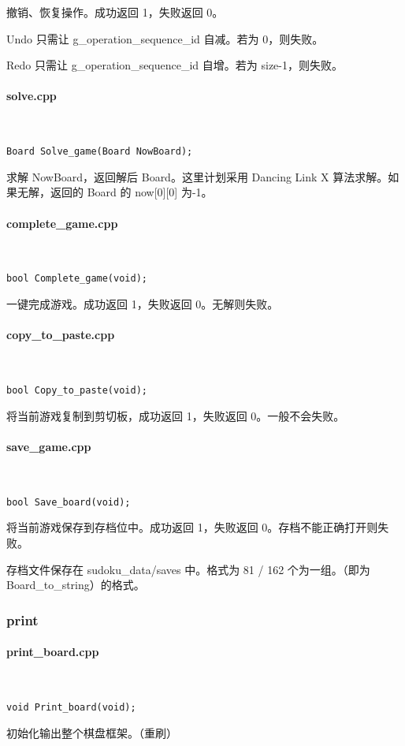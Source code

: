 \documentclass{article}
\newcommand{\subsubsubsection}[1]{\paragraph{#1}\mbox{}\\}
\begin{document}
    撤销、恢复操作。成功返回 1，失败返回 0。

    Undo 只需让 g\_operation\_sequence\_id 自减。若为 0，则失败。

    Redo 只需让 g\_operation\_sequence\_id 自增。若为 size-1，则失败。

    \subsubsubsection{solve.cpp}

    \begin{lstlisting}
Board Solve_game(Board NowBoard);
    \end{lstlisting}
    
    求解 NowBoard，返回解后 Board。这里计划采用 Dancing Link X 算法求解。如果无解，返回的 Board 的 now[0][0] 为-1。

    \subsubsubsection{complete\_game.cpp}

    \begin{lstlisting}
bool Complete_game(void);
    \end{lstlisting}

    一键完成游戏。成功返回 1，失败返回 0。无解则失败。

    \subsubsubsection{copy\_to\_paste.cpp}

    \begin{lstlisting}
bool Copy_to_paste(void);
    \end{lstlisting}

    将当前游戏复制到剪切板，成功返回 1，失败返回 0。一般不会失败。

    \subsubsubsection{save\_game.cpp}

    \begin{lstlisting}
bool Save_board(void);
    \end{lstlisting}

    将当前游戏保存到存档位中。成功返回 1，失败返回 0。存档不能正确打开则失败。

    存档文件保存在 sudoku\_data/saves 中。格式为 81 / 162 个为一组。（即为 Board\_to\_string）的格式。

    \subsubsection{print}

    \subsubsubsection{print\_board.cpp}

    \begin{lstlisting}
void Print_board(void);
    \end{lstlisting}

    初始化输出整个棋盘框架。（重刷）
    
\end{document}
